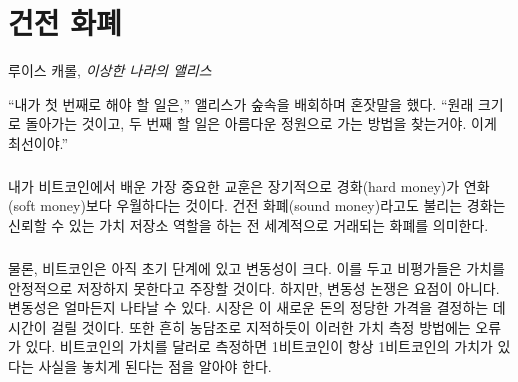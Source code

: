 \chapter{건전 화폐}
\label{les:14}

\begin{chapquote}{루이스 캐롤, \textit{이상한 나라의 앨리스}}
	\begin{comment}	
		\enquote{The first thing I've got to do,} said Alice to herself, as she wandered about
		in the wood, \enquote{is to grow to my right size, and the second thing is to find my
			way into that lovely garden. I think that will be the best plan.}
	\end{comment}
	\enquote{내가 첫 번째로 해야 할 일은,} 앨리스가 숲속을 배회하며 혼잣말을 했다. \enquote{원래 크기로 돌아가는 것이고, 
		두 번째 할 일은 아름다운 정원으로 가는 방법을 찾는거야. 이게 최선이야.}
\end{chapquote}

\paragraph{}
\begin{comment}	
	The most important lesson I have learned from Bitcoin is that in the
	long run, hard money is superior to soft money. Hard money, also
	referred to as \textit{sound money}, is any globally traded currency that
	serves as a reliable store of value.
\end{comment}
내가 비트코인에서 배운 가장 중요한 교훈은 장기적으로 경화(hard money)가 연화(soft money)보다 우월하다는 것이다.
건전 화폐(sound money)라고도 불리는 경화는 신뢰할 수 있는 가치 저장소 역할을 하는 전 세계적으로 거래되는 화폐를 의미한다.

\paragraph{}
\begin{comment}	
	Granted, Bitcoin is still young and volatile. Critics will say that it
	does not store value reliably. The volatility argument is missing the
	point. Volatility is to be expected. The market will take a while to
	figure out the just price of this new money. Also, as is often jokingly
	pointed out, it is grounded in an error of measurement. If you think in
	dollars you will fail to see that one bitcoin will always be worth one
	bitcoin.
\end{comment}
물론, 비트코인은 아직 초기 단계에 있고 변동성이 크다. 
이를 두고 비평가들은 가치를 안정적으로 저장하지 못한다고 주장할 것이다.
하지만, 변동성 논쟁은 요점이 아니다. 변동성은 얼마든지 나타날 수 있다. 
시장은 이 새로운 돈의 정당한 가격을 결정하는 데 시간이 걸릴 것이다. 
또한 흔히 농담조로 지적하듯이 이러한 가치 측정 방법에는 오류가 있다. 
비트코인의 가치를 달러로 측정하면 1비트코인이 항상 1비트코인의 가치가 있다는 사실을 놓치게 된다는 점을 알아야 한다.


